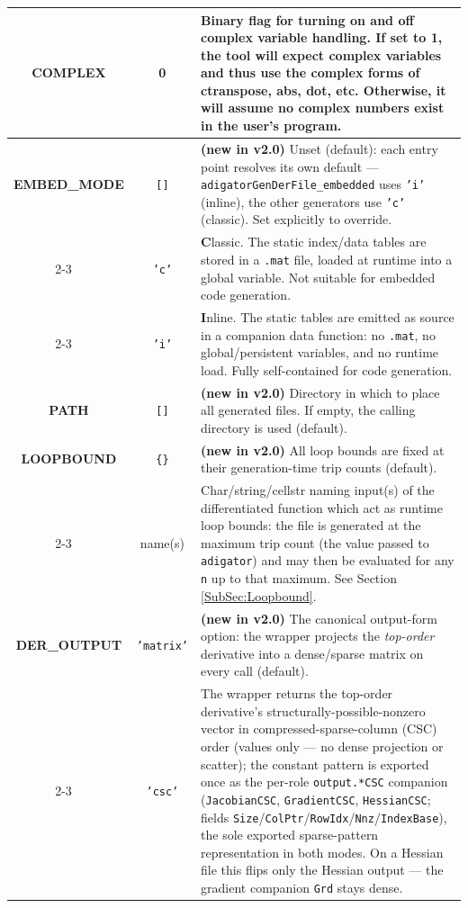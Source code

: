 \documentclass[10pt,pdftex]{article}
\begin{document}
\begin{longtable}{|c|c|p{9.9cm}|}
{\bf COMPLEX} & 0 & Binary flag for turning on and off complex variable handling. If set to 1, the tool will expect complex variables and thus use the complex forms of ctranspose, abs, dot, etc. Otherwise, it will assume no complex numbers exist in the user's program.\\ \hline
{\bf EMBED\_MODE} & \texttt{[]} & {\bf (new in v2.0)} Unset (default): each entry point resolves its own default --- \texttt{adigatorGenDerFile\_embedded} uses \texttt{'i'} (inline), the other generators use \texttt{'c'} (classic). Set explicitly to override. \\ \cline{2-3}
~ & \texttt{'c'} & {\bf C}lassic. The static index/data tables are stored in a \texttt{.mat} file, loaded at runtime into a global variable. Not suitable for embedded code generation. \\ \cline{2-3}
~ & \texttt{'i'} & {\bf I}nline. The static tables are emitted as source in a companion data function: no \texttt{.mat}, no global/persistent variables, and no runtime load. Fully self-contained for code generation. \\ \hline
{\bf PATH} & \texttt{[]} & {\bf (new in v2.0)} Directory in which to place all generated files. If empty, the calling directory is used (default). \\ \hline
{\bf LOOPBOUND} & \texttt{\{\}} & {\bf (new in v2.0)} All loop bounds are fixed at their generation-time trip counts (default). \\ \cline{2-3}
~ & name(s) & Char/string/cellstr naming input(s) of the differentiated function which act as runtime loop bounds: the file is generated at the maximum trip count (the value passed to \texttt{adigator}) and may then be evaluated for any \texttt{n} up to that maximum. See Section \ref{SubSec:Loopbound}. \\ \hline
{\bf DER\_OUTPUT} & \texttt{'matrix'} & {\bf (new in v2.0)} The canonical output-form option: the wrapper projects the {\em top-order} derivative into a dense/sparse matrix on every call (default). \\ \cline{2-3}
~ & \texttt{'csc'} & The wrapper returns the top-order derivative's structurally-possible-nonzero vector in compressed-sparse-column (CSC) order (values only --- no dense projection or scatter); the constant pattern is exported once as the per-role \texttt{output.*CSC} companion (\texttt{JacobianCSC}, \texttt{GradientCSC}, \texttt{HessianCSC}; fields \texttt{Size}/\texttt{ColPtr}/\texttt{RowIdx}/\texttt{Nnz}/\texttt{IndexBase}), the sole exported sparse-pattern representation in both modes. On a Hessian file this flips only the Hessian output --- the gradient companion \texttt{Grd} stays dense. \\ \hline

\end{longtable}
\end{document}
